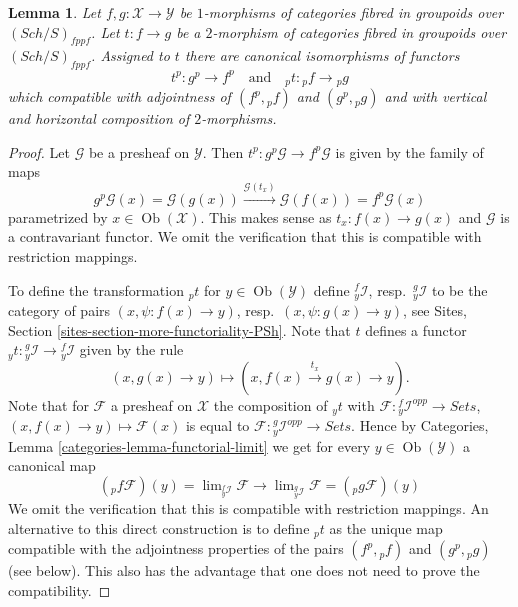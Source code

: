 \documentclass{stacks-project}
\theoremstyle{plain}
\newtheorem{lemma}[subsection]{Lemma}
\theoremstyle{definition}
\theoremstyle{remark}
\numberwithin{equation}{subsection}
\def\lim{\mathop{\mathrm{lim}}\nolimits}
\def\Sch{\mathit{Sch}}
\def\Ob{\mathop{\mathrm{Ob}}\nolimits}
\begin{document}
\begin{lemma}
\label{lemma-2-morphisms-presheaves}
Let $f, g : \mathcal{X} \to \mathcal{Y}$ be $1$-morphisms of categories
fibred in groupoids over $(\Sch/S)_{fppf}$. Let $t : f \to g$
be a $2$-morphism of categories fibred in groupoids over
$(\Sch/S)_{fppf}$. Assigned to $t$ there are canonical
isomorphisms of functors
$$
t^p : g^p \longrightarrow f^p
\quad\text{and}\quad
{}_pt : {}_pf \longrightarrow {}_pg
$$
which compatible with adjointness of $(f^p, {}_pf)$ and
$(g^p, {}_pg)$ and with
vertical and horizontal composition of $2$-morphisms.
\end{lemma}

\begin{proof}
Let $\mathcal{G}$ be a presheaf on $\mathcal{Y}$. Then
$t^p : g^p\mathcal{G} \to f^p\mathcal{G}$ is given by the family
of maps
$$
g^p\mathcal{G}(x) = \mathcal{G}(g(x))
\xrightarrow{\mathcal{G}(t_x)}
\mathcal{G}(f(x)) = f^p\mathcal{G}(x)
$$
parametrized by $x \in \Ob(\mathcal{X})$. This makes sense as
$t_x : f(x) \to g(x)$ and $\mathcal{G}$ is a contravariant functor.
We omit the verification that this is compatible with restriction
mappings.

\medskip\noindent
To define the transformation ${}_pt$ for $y \in \Ob(\mathcal{Y})$
define ${}_y^f\mathcal{I}$, resp.\ ${}_y^g\mathcal{I}$ to be the category
of pairs $(x, \psi : f(x) \to y)$, resp.\ $(x, \psi : g(x) \to y)$, see
Sites, Section \ref{sites-section-more-functoriality-PSh}.
Note that $t$ defines a functor
${}_yt : {}_y^g\mathcal{I} \to {}_y^f\mathcal{I}$
given by the rule
$$
(x, g(x) \to y) \longmapsto (x, f(x) \xrightarrow{t_x} g(x) \to y).
$$
Note that for $\mathcal{F}$ a presheaf on $\mathcal{X}$ the composition
of ${}_yt$ with $\mathcal{F} : {}_y^f\mathcal{I}^{opp} \to \textit{Sets}$,
$(x, f(x) \to y) \mapsto \mathcal{F}(x)$ is equal to
$\mathcal{F} : {}_y^g\mathcal{I}^{opp} \to \textit{Sets}$. Hence by
Categories, Lemma \ref{categories-lemma-functorial-limit}
we get for every $y \in \Ob(\mathcal{Y})$ a canonical map
$$
({}_pf\mathcal{F})(y) = \lim_{{}_y^f\mathcal{I}} \mathcal{F}
\longrightarrow
\lim_{{}_y^g\mathcal{I}} \mathcal{F} = ({}_pg\mathcal{F})(y)
$$
We omit the verification that this is compatible with restriction
mappings. An alternative to this direct construction is to define
${}_pt$ as the unique map compatible with the adjointness properties
of the pairs $(f^p, {}_pf)$ and $(g^p, {}_pg)$ (see below). This also
has the advantage that one does not need to prove the compatibility.


\end{proof}
\end{document}
